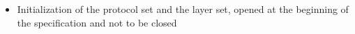 \documentclass{article}
\newcommand{\inferA}[3]{\inferrule*[Right=#1,rightskip=-10pt]{#2}{#3}}
\begin{document}
\begin{itemize}
\begin{comment}
    \and\inferA {(C-9)}
    { \mathcal{C} \vdash \diamond \\ \mathcal{T} \vdash \diamond \\ \mathcal{G} \vdash \diamond \\ \mathcal{P}\textit{set}, \mathcal{L}\textit{set}, \mathcal{L} \vdash D
    }
    { \mathcal{P}\textit{set}, \mathcal{L}\textit{set}, \mathcal{C}, \mathcal{T}, \mathcal{G}, \mathcal{L} \vdash D }

    \and\inferA {(C-10)}
    { \mathcal{C} \vdash \diamond \\ \mathcal{T} \vdash \diamond \\ \mathcal{G} \vdash \diamond \\ \mathcal{L} \vdash \diamond \\ \mathcal{P} \vdash e:A
    }
    { \mathcal{C}, \mathcal{T}, \mathcal{G}, \mathcal{L}, \mathcal{P} \vdash e:A }

    \and\inferA {(C-11)}
    { \mathcal{C} \vdash \diamond \\ \mathcal{T} \vdash \diamond \\ \mathcal{G} \vdash \diamond \\ \mathcal{L} \vdash \diamond  \\ \mathcal{P}\textit{set}, \mathcal{L}\textit{set}, \mathcal{P} \vdash D
    }
    { \mathcal{P}\textit{set}, \mathcal{L}\textit{set}, \mathcal{C}, \mathcal{T}, \mathcal{G}, \mathcal{L}, \mathcal{P} \vdash D }

    \and\inferA {(C-12)}
    { \mathcal{P}\textit{set} \vdash \diamond \\ \mathcal{L}\textit{set} \vdash \diamond \\
      \mathcal{C}, \mathcal{T}, \mathcal{G}, \mathcal{L} \vdash e:A
    }
    { \mathcal{P}\textit{set}, \mathcal{L}\textit{set}, \mathcal{C}, \mathcal{T}, \mathcal{G}, \mathcal{L} \vdash e:A }

    \and\inferA {(C-13)}
    { \mathcal{P}\textit{set} \vdash \diamond \\ \mathcal{L}\textit{set} \vdash \diamond \\
      \mathcal{C}, \mathcal{T}, \mathcal{G}, \mathcal{L}, \mathcal{P} \vdash e:A
    }
    { \mathcal{P}\textit{set}, \mathcal{L}\textit{set}, \mathcal{C}, \mathcal{T}, \mathcal{G}, \mathcal{L}, \mathcal{P} \vdash e:A }

\end{mathpar}
\end{comment}

  \item Initialization of the protocol set and the layer set, opened at the beginning of the specification and not to be closed


\end{itemize}
\end{document}
